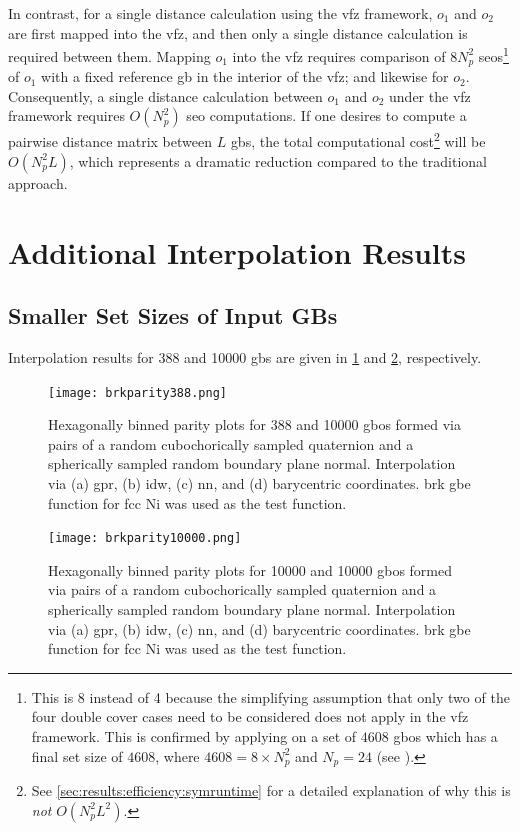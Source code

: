 \documentclass[preprint,12pt]{elsarticle}
\begin{document}
In contrast, for a single distance calculation using the \gls{vfz} framework, $o_1$ and $o_2$ are first mapped into the \gls{vfz}, and then only a single distance calculation is required between them. Mapping $o_1$ into the \gls{vfz} requires comparison of $8N_p^2$ \glspl{seo}\footnote{This is 8 instead of 4 because the simplifying assumption that only two of the four double cover cases need to be considered \cite{francisGeodesicOctonionMetric2019} does not apply in the \gls{vfz} framework. This is confirmed by applying  on a set of $4608$ \glspl{gbo} which has a final set size of $4608$, where $4608=8\times N_p^2$ and $N_p=24$ (see ).} of $o_1$ with a fixed reference \gls{gb} in the interior of the \gls{vfz}; and likewise for $o_2$. Consequently, a single distance calculation between $o_1$ and $o_2$ under the \gls{vfz} framework requires $O(N_p^2)$ \gls{seo} computations. If one desires to compute a pairwise distance matrix between $L$ \glspl{gb}, the total computational cost\footnote{See \cref{sec:results:efficiency:symruntime} for a detailed explanation of why this is \emph{not} $O(N_p^2L^2)$.} will be $O(N_p^2L)$, which represents a dramatic reduction compared to the traditional approach.

\section{Additional Interpolation Results}

\subsection{Smaller Set Sizes of Input GBs}
Interpolation results for \num{388} and \num{10000} \glspl{gb} are given in \cref{fig:brkparity388} and \cref{fig:brkparity10000}, respectively.

\begin{figure}[!ht]
    \centering
    \texttt{[image: brkparity388.png]}
    \caption{Hexagonally binned parity plots for \num{388} \inpt{} and \num{10000} \outpt{} \glspl{gbo} formed via pairs of a random cubochorically sampled quaternion and a spherically sampled random boundary plane normal. Interpolation via (a) \gls{gpr}, (b) \gls{idw}, (c) \gls{nn}, and (d) barycentric coordinates.  \gls{brk} \gls{gbe} function for \gls{fcc} Ni \cite{bulatovGrainBoundaryEnergy2014} was used as the test function.}
    \label{fig:brkparity388}
\end{figure}

\begin{figure}[!ht]
    \centering
    \texttt{[image: brkparity10000.png]}
    \caption{Hexagonally binned parity plots for \num{10000} \inpt{} and \num{10000} \outpt{} \glspl{gbo} formed via pairs of a random cubochorically sampled quaternion and a spherically sampled random boundary plane normal. Interpolation via (a) \gls{gpr}, (b) \gls{idw}, (c) \gls{nn}, and (d) barycentric coordinates.  \gls{brk} \gls{gbe} function for \gls{fcc} Ni \cite{bulatovGrainBoundaryEnergy2014} was used as the test function.}
    \label{fig:brkparity10000}
\end{figure}
\end{document}
